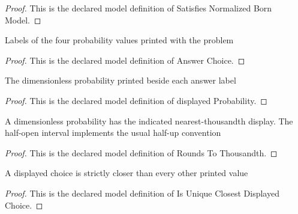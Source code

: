 \begin{proof}
  This is the declared model definition of Satisfies Normalized Born Model.
\end{proof}
\begin{definition}
  \label{def:physics:phyx-mini-0651:phyxminiproblems-problemphyxmini0651-answerchoice}
  Labels of the four probability values printed with the problem
\end{definition}
\begin{proof}
  This is the declared model definition of Answer Choice.
\end{proof}
\begin{definition}
  \label{def:physics:phyx-mini-0651:phyxminiproblems-problemphyxmini0651-displayedprobability}
  The dimensionless probability printed beside each answer label
\end{definition}
\begin{proof}
  This is the declared model definition of displayed Probability.
\end{proof}
\begin{definition}
  \label{def:physics:phyx-mini-0651:phyxminiproblems-problemphyxmini0651-roundstothousandth}
  A dimensionless probability has the indicated nearest-thousandth display. The half-open interval implements the usual half-up convention
\end{definition}
\begin{proof}
  This is the declared model definition of Rounds To Thousandth.
\end{proof}
\begin{definition}
  \label{def:physics:phyx-mini-0651:phyxminiproblems-problemphyxmini0651-isuniqueclosestdisplayedchoice}
  A displayed choice is strictly closer than every other printed value
\end{definition}
\begin{proof}
  This is the declared model definition of Is Unique Closest Displayed Choice.
\end{proof}
